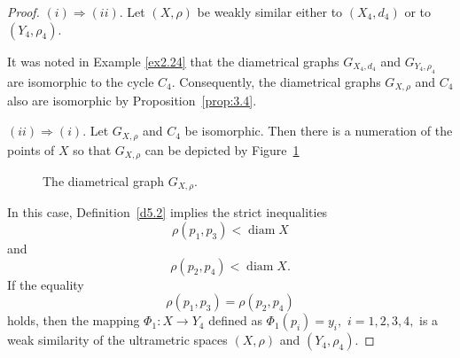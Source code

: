 \documentclass[11pt]{article}
\theoremstyle{definition}
\theoremstyle{remark}
\numberwithin{equation}{section}
\begin{document}
\begin{proof}
    
$(i) \Rightarrow (ii)$. 
Let $(X,\rho)$ be weakly similar either to $(X_4, d_4)$ or to $(Y_4, \rho_4)$.


It was noted in Example \ref{ex2.24} that the diametrical graphs $G_{X_4, d_4}$ and $G_{Y_4, \rho_4}$ are isomorphic to the cycle $C_4$. Consequently, the diametrical graphs $G_{X,\rho}$ and $C_4$ also are isomorphic by Proposition~\ref{prop:3.4}.

  
$(ii) \Rightarrow (i)$. 
Let $G_{X,\rho}$ and $C_4$ be isomorphic.
Then there is a numeration of the points of $X$ so that
$G_{X,\rho}$
can be depicted 
by Figure~\ref{cis3}


\begin{figure}[H]
  \centering
  \caption{The diametrical graph $G_{X,\rho}$.}
  \label{cis3}
\end{figure}




In this case, Definition~\ref{d5.2}
implies the strict inequalities 
\begin{equation}\label{di221}
    \rho(p_1,p_3)<\operatorname{diam} X
\end{equation}
and
\begin{equation}\label{di222}
    \rho(p_2,p_4)<\operatorname{diam} X.
\end{equation}
If the equality 
\begin{equation}\label{wseer}
\rho(p_{1},p_{3})=\rho(p_{2},p_{4}) 
\end{equation}
holds, then the mapping $
\Phi_{1}\colon X \to Y_{4}
$
defined as $
\Phi_{1}(p_{i}) = y_{i},$ $i=1,2,3,4,
$
is a weak similarity of the ultrametric spaces $(X,\rho)$ and $(Y_{4},\rho_{4})$.


\end{proof}
\end{document}
